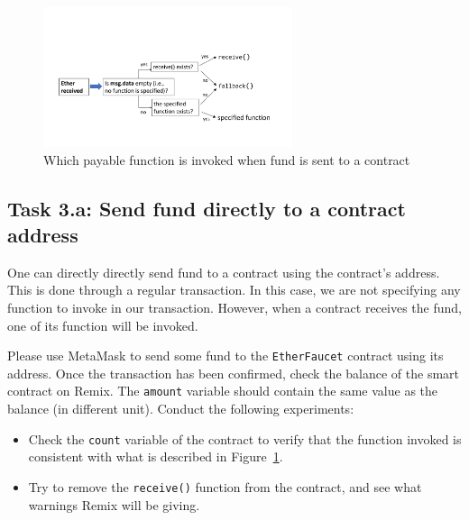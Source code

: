 \begin{figure}[htb]
\begin{center}
\includegraphics[width=0.65\textwidth]{Figs/send_fund.pdf}
\end{center}
\caption{Which payable function is invoked when fund is sent to a contract}
\label{fig:payable_function}
\end{figure}
 

\subsection{Task 3.a: Send fund directly to a contract address} 

One can directly directly send fund to a contract using the contract's 
address. This is done through a regular transaction. 
In this case, we are not specifying any function to invoke 
in our transaction. However, when a contract receives the fund,
one of its function will be invoked. 


Please use MetaMask to send some fund to the \texttt{EtherFaucet}
contract using its address. Once the transaction has been confirmed,
check the balance of the smart contract on Remix. 
The \texttt{amount} variable should contain the same value as the 
balance (in different unit). Conduct the following experiments:


\begin{itemize}[noitemsep]
\item Check the \texttt{count} variable of the contract to verify 
that the function invoked is consistent with what is 
described in Figure~\ref{fig:payable_function}. 

\item Try to remove the \texttt{receive()} function from the 
contract, and see what warnings Remix will be giving. 
\end{itemize}
 


